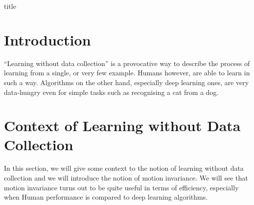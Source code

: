 \documentclass[12pt]{article}
\begin{document}
{title}

\tableofcontents



 



\section{Introduction}
``Learning without data collection'' is a provocative way to describe the process of learning from a single, or very few example. Humans however, are able to learn in such a way. Algorithms on the other hand, especially deep learning ones, are very data-hungry even for simple tasks such as recognising a cat from a dog.

\section{Context of Learning without Data Collection}
\label{sec: in favor of MI}
In this section, we will give some context to the notion of learning without data collection and we will introduce the notion of motion invariance. We will see that motion invariance turns out to be quite useful in terms of efficiency, especially when Human performance is compared to deep learning algorithms.
\end{document}
